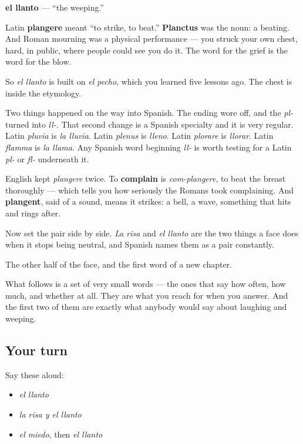 \begin{cousinweb}
\textbf{el llanto} — \textquotedblleft{}the weeping.\textquotedblright{}

Latin \textbf{plangere} meant \textquotedblleft{}to strike, to beat.\textquotedblright{} \textbf{Planctus} was the noun: a beating. And Roman mourning was a physical performance — you struck your own chest, hard, in public, where people could see you do it. The word for the grief is the word for the blow.

So \emph{el llanto} is built on \emph{el pecho}, which you learned five lessons ago. The chest is inside the etymology.

Two things happened on the way into Spanish. The ending wore off, and the \emph{pl-} turned into \emph{ll-}. That second change is a Spanish specialty and it is very regular. Latin \emph{pluvia} is \emph{la lluvia}. Latin \emph{plenus} is \emph{lleno}. Latin \emph{plorare} is \emph{llorar}. Latin \emph{flamma} is \emph{la llama}. Any Spanish word beginning \emph{ll-} is worth testing for a Latin \emph{pl-} or \emph{fl-} underneath it.

English kept \emph{plangere} twice. To \textbf{complain} is \emph{com-plangere}, to beat the breast thoroughly — which tells you how seriously the Romans took complaining. And \textbf{plangent}, said of a sound, means it strikes: a bell, a wave, something that hits and rings after.

Now set the pair side by side. \emph{La risa} and \emph{el llanto} are the two things a face does when it stops being neutral, and Spanish names them as a pair constantly.
\end{cousinweb}

\begin{grammarlens}[title={What you've built}]
The other half of the face, and the first word of a new chapter.

What follows is a set of very small words — the ones that say how often, how much, and whether at all. They are what you reach for when you answer. And the first two of them are exactly what anybody would say about laughing and weeping.
\end{grammarlens}

\subsection*{Your turn}
Say these aloud:

\begin{itemize}
\raggedright
  \item \emph{el llanto}
  \item \emph{la risa y el llanto}
  \item \emph{el miedo}, then \emph{el llanto}
\end{itemize}

